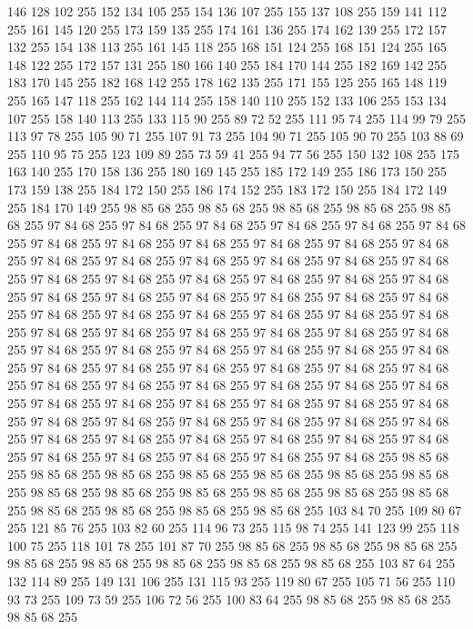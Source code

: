 146 128 102 255 152 134 105 255 154 136 107 255 155 137 108 255 159 141 112 255 161 145 120 255 173 159 135 255 174 161 136 255 174 162 139 255 172 157 132 255 154 138 113 255 161 145 118 255 168 151 124 255 168 151 124 255 165 148 122 255 172 157 131 255 180 166 140 255 184 170 144 255 182 169 142 255 183 170 145 255 182 168 142 255 178 162 135 255 171 155 125 255 165 148 119 255 165 147 118 255 162 144 114 255 158 140 110 255 152 133 106 255 153 134 107 255 158 140 113 255 133 115 90 255 89 72 52 255 111 95 74 255 114 99 79 255 113 97 78 255 105 90 71 255 107 91 73 255 104 90 71 255 105 90 70 255 103 88 69 255 110 95 75 255 123 109 89 255 73 59 41 255 94 77 56 255 150 132 108 255 175 163 140 255 170 158 136 255 180 169 145 255 185 172 149 255 186 173 150 255 173 159 138 255 184 172 150 255 186 174 152 255 183 172 150 255 184 172 149 255 184 170 149 255 98 85 68 255 98 85 68 255 98 85 68 255 98 85 68 255 98 85 68 255 97 84 68 255 97 84 68 255 97 84 68 255
97 84 68 255 97 84 68 255 97 84 68 255 97 84 68 255 97 84 68 255 97 84 68 255 97 84 68 255 97 84 68 255 97 84 68 255 97 84 68 255 97 84 68 255 97 84 68 255 97 84 68 255 97 84 68 255 97 84 68 255 97 84 68 255 97 84 68 255 97 84 68 255 97 84 68 255 97 84 68 255 97 84 68 255 97 84 68 255 97 84 68 255 97 84 68 255 97 84 68 255 97 84 68 255 97 84 68 255 97 84 68 255 97 84 68 255 97 84 68 255 97 84 68 255 97 84 68 255 97 84 68 255 97 84 68 255 97 84 68 255 97 84 68 255 97 84 68 255 97 84 68 255 97 84 68 255 97 84 68 255 97 84 68 255 97 84 68 255 97 84 68 255 97 84 68 255 97 84 68 255 97 84 68 255 97 84 68 255 97 84 68 255 97 84 68 255 97 84 68 255 97 84 68 255 97 84 68 255 97 84 68 255 97 84 68 255 97 84 68 255 97 84 68 255 97 84 68 255 97 84 68 255 97 84 68 255 97 84 68 255 97 84 68 255 97 84 68 255 97 84 68 255 97 84 68 255
97 84 68 255 97 84 68 255 97 84 68 255 97 84 68 255 97 84 68 255 97 84 68 255 97 84 68 255 97 84 68 255 97 84 68 255 97 84 68 255 97 84 68 255 97 84 68 255 97 84 68 255 97 84 68 255 97 84 68 255 97 84 68 255 98 85 68 255 98 85 68 255 98 85 68 255 98 85 68 255 98 85 68 255 98 85 68 255 98 85 68 255 98 85 68 255 98 85 68 255 98 85 68 255 98 85 68 255 98 85 68 255 98 85 68 255 98 85 68 255 98 85 68 255 98 85 68 255 98 85 68 255 103 84 70 255 109 80 67 255 121 85 76 255 103 82 60 255 114 96 73 255 115 98 74 255 141 123 99 255 118 100 75 255 118 101 78 255 101 87 70 255 98 85 68 255 98 85 68 255 98 85 68 255 98 85 68 255 98 85 68 255 98 85 68 255 98 85 68 255 98 85 68 255 103 87 64 255 132 114 89 255 149 131 106 255 131 115 93 255 119 80 67 255 105 71 56 255 110 93 73 255 109 73 59 255 106 72 56 255 100 83 64 255 98 85 68 255 98 85 68 255 98 85 68 255
